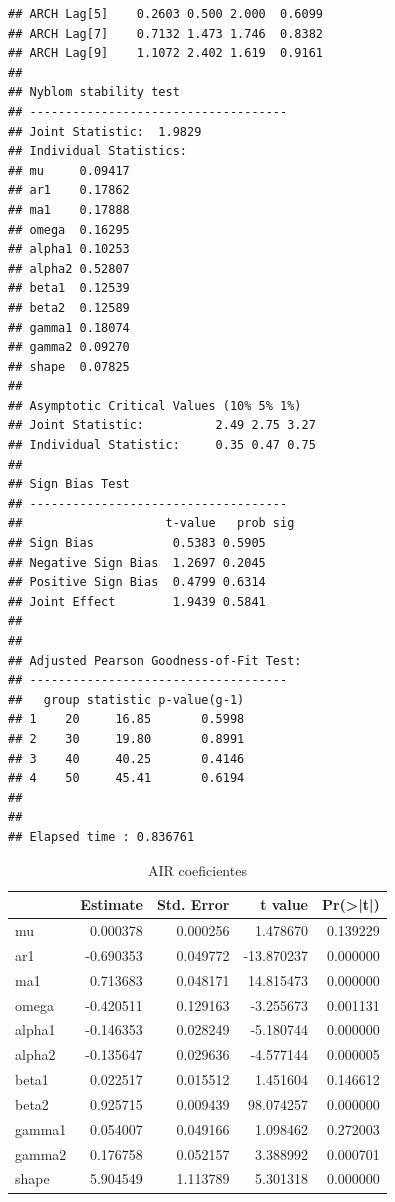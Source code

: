 \documentclass[
  12pt,
  a4paper,
  openany]{book}
\begin{document}
\begin{verbatim}
## ARCH Lag[5]    0.2603 0.500 2.000  0.6099
## ARCH Lag[7]    0.7132 1.473 1.746  0.8382
## ARCH Lag[9]    1.1072 2.402 1.619  0.9161
## 
## Nyblom stability test
## ------------------------------------
## Joint Statistic:  1.9829
## Individual Statistics:              
## mu     0.09417
## ar1    0.17862
## ma1    0.17888
## omega  0.16295
## alpha1 0.10253
## alpha2 0.52807
## beta1  0.12539
## beta2  0.12589
## gamma1 0.18074
## gamma2 0.09270
## shape  0.07825
## 
## Asymptotic Critical Values (10% 5% 1%)
## Joint Statistic:          2.49 2.75 3.27
## Individual Statistic:     0.35 0.47 0.75
## 
## Sign Bias Test
## ------------------------------------
##                    t-value   prob sig
## Sign Bias           0.5383 0.5905    
## Negative Sign Bias  1.2697 0.2045    
## Positive Sign Bias  0.4799 0.6314    
## Joint Effect        1.9439 0.5841    
## 
## 
## Adjusted Pearson Goodness-of-Fit Test:
## ------------------------------------
##   group statistic p-value(g-1)
## 1    20     16.85       0.5998
## 2    30     19.80       0.8991
## 3    40     40.25       0.4146
## 4    50     45.41       0.6194
## 
## 
## Elapsed time : 0.836761
\end{verbatim}

\begin{table}[!h]

\caption{\label{tab:unnamed-chunk-31}AIR coeficientes}
\centering
\begin{tabular}[t]{lrrrr}
\toprule
  &  Estimate &  Std. Error &  t value & Pr(>|t|)\\
\midrule
mu & 0.000378 & 0.000256 & 1.478670 & 0.139229\\
ar1 & -0.690353 & 0.049772 & -13.870237 & 0.000000\\
ma1 & 0.713683 & 0.048171 & 14.815473 & 0.000000\\
omega & -0.420511 & 0.129163 & -3.255673 & 0.001131\\
alpha1 & -0.146353 & 0.028249 & -5.180744 & 0.000000\\
\addlinespace
alpha2 & -0.135647 & 0.029636 & -4.577144 & 0.000005\\
beta1 & 0.022517 & 0.015512 & 1.451604 & 0.146612\\
beta2 & 0.925715 & 0.009439 & 98.074257 & 0.000000\\
gamma1 & 0.054007 & 0.049166 & 1.098462 & 0.272003\\
gamma2 & 0.176758 & 0.052157 & 3.388992 & 0.000701\\
\addlinespace
shape & 5.904549 & 1.113789 & 5.301318 & 0.000000\\
\bottomrule
\end{tabular}
\end{table}
\FloatBarrier
\centering
\end{document}

